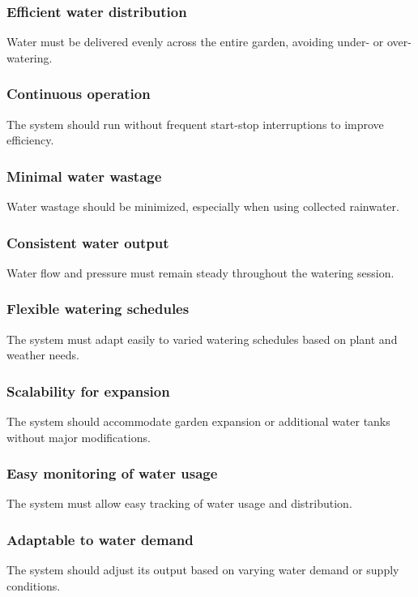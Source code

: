 \documentclass[11pt]{article}
\begin{document}
\subsubsection{Efficient water distribution}
Water must be delivered evenly across the entire garden, avoiding under- or over-watering.

\subsubsection{Continuous operation}
The system should run without frequent start-stop interruptions to improve efficiency.

\subsubsection{Minimal water wastage}
Water wastage should be minimized, especially when using collected rainwater.

\subsubsection{Consistent water output}
Water flow and pressure must remain steady throughout the watering session.

\subsubsection{Flexible watering schedules}
The system must adapt easily to varied watering schedules based on plant and weather needs.

\subsubsection{Scalability for expansion}
The system should accommodate garden expansion or additional water tanks without major modifications.

\subsubsection{Easy monitoring of water usage}
The system must allow easy tracking of water usage and distribution.

\subsubsection{Adaptable to water demand}
The system should adjust its output based on varying water demand or supply conditions.
\end{document}
